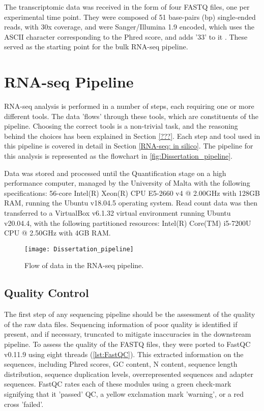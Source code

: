 The transcriptomic data was received in the form of four FASTQ \citep{cock2010sanger} files, one per experimental time point. They were composed of 51 base-pairs (bp) single-ended reads, with 30x coverage, and were Sanger/Illumina 1.9 encoded, which uses the ASCII character corresponding to the Phred score, and adds '33' to it \citep{ewing1998base}. These served as the starting point for the bulk RNA-seq pipeline.

\section{RNA-seq Pipeline}
RNA-seq analysis is performed in a number of steps, each requiring one or more different tools. The data 'flows' through these tools, which are constituents of the pipeline. Choosing the correct tools is a non-trivial task, and the reasoning behind the choices has been explained in Section \ref{???}. Each step and tool used in this pipeline is covered in detail in Section \ref{RNA-seq: in silico}. The pipeline for this analysis is represented as the flowchart in \autoref{fig:Dissertation_pipeline}.

Data was stored and processed until the Quantification stage on a high performance computer, managed by the University of Malta with the following specifications: 56-core Intel(R) Xeon(R) CPU E5-2660 v4 @ 2.00GHz with 128GB RAM, running the Ubuntu v18.04.5 operating system. Read count data was then transferred to a VirtualBox v6.1.32 \citep{virtualbox} virtual environment running Ubuntu v20.04.4, with the following partitioned resources: Intel(R) Core(TM) i5-7200U CPU @ 2.50GHz with 4GB RAM.
\begin{figure}[!h]
    \centering
    \texttt{[image: Dissertation\_pipeline]}
    \caption[Flow of data in the RNA-seq pipeline]{Flow of data in the RNA-seq pipeline.} 
    \label{fig:Dissertation_pipeline}
\end{figure}
\clearpage

\subsection{Quality Control}

The first step of any sequencing pipeline should be the assessment of the quality of the raw data files. Sequencing information of poor quality is identified if present, and if necessary, truncated to mitigate inaccuracies in the downstream pipeline. To assess the quality of the FASTQ files, they were ported to FastQC v0.11.9 \citep{andrews2010fastqc} using eight threads (\autoref{lst:FastQC}). This extracted information on the sequences, including Phred scores, GC content, N content, sequence length distribution, sequence duplication levels, overrepresented sequences and adapter sequences. FastQC rates each of these modules using a green check-mark signifying that it 'passed' QC, a yellow exclamation mark 'warning', or a red cross 'failed'. 

